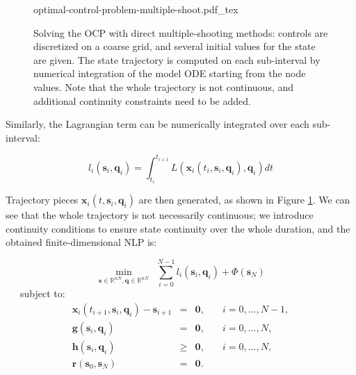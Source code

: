 \begin{figure}
  \centering
      {\def\svgwidth{0.9\linewidth}
        
                   {optimal-control-problem-multiple-shoot.pdf_tex}
      }
      \caption{Solving the OCP with direct multiple-shooting methods:
        controls are discretized on a coarse grid, and several initial
        values for the state are given. The state trajectory is
        computed on each sub-interval by numerical integration of the
        model ODE starting from the node values. Note that the whole
        trajectory is not continuous, and additional continuity
        constraints need to be added.}
      \label{fig:chap3-optimal-control-problem-multiple-shoot}
\end{figure}

Similarly, the Lagrangian term can be numerically integrated over each
sub-interval:

\begin{equation}
l_i(\mathbf{s}_i,\mathbf{q}_i) =
\int_{t_i}^{t_{i+1}}L(\mathbf{x}_i(t_i,\mathbf{s}_i,\mathbf{q}_i),\mathbf{q}_i)dt
\end{equation}

Trajectory pieces $\mathbf{x}_i(t,\mathbf{s}_i,\mathbf{q}_i)$ are then
generated, as shown in Figure
\ref{fig:chap3-optimal-control-problem-multiple-shoot}. We can see
that the whole trajectory is not necessarily continuous; we introduce
continuity conditions to ensure state continuity over the whole
duration, and the obtained finite-dimensional NLP is:

\begin{equation}
  \min_{\mathbf{s}\in\mathbb R^{nN},\mathbf{q}\in\mathbb R^{nN}}
  \ \ \sum_{i=0}^{N-1}l_i(\mathbf{s}_i,\mathbf{q}_i) +
  \Phi(\mathbf{s}_N)
\end{equation}
\ \ \ subject to:
\begin{equation}
  \begin{array}{rcll}
   \mathbf{x}_i(t_{i+1},\mathbf{s}_i,\mathbf{q}_i) - \mathbf{s}_{i+1} &
    = & \mathbf{0}, & \quad i=0,\ldots,N-1,\\%
    \mathbf{g}(\mathbf{s}_i,\mathbf{q}_i) & = & \mathbf{0}, & \quad i=0,\ldots,N,%
    \\%
    \mathbf{h}(\mathbf{s}_i,\mathbf{q}_i) & \ge & \mathbf{0}, & \quad i=0,\ldots,N,%
    \\%
    \mathbf{r} (\mathbf{s}_0,\mathbf{s}_N) & = & \mathbf{0}.%
    \\%
  \end{array}
\end{equation} 

